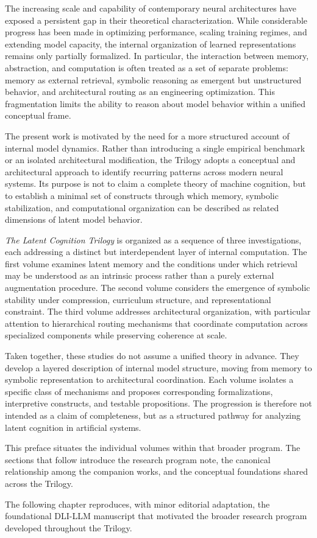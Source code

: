 The increasing scale and capability of contemporary neural architectures have exposed a persistent gap in their theoretical characterization. While considerable progress has been made in optimizing performance, scaling training regimes, and extending model capacity, the internal organization of learned representations remains only partially formalized. In particular, the interaction between memory, abstraction, and computation is often treated as a set of separate problems: memory as external retrieval, symbolic reasoning as emergent but unstructured behavior, and architectural routing as an engineering optimization. This fragmentation limits the ability to reason about model behavior within a unified conceptual frame.

The present work is motivated by the need for a more structured account of internal model dynamics. Rather than introducing a single empirical benchmark or an isolated architectural modification, the Trilogy adopts a conceptual and architectural approach to identify recurring patterns across modern neural systems. Its purpose is not to claim a complete theory of machine cognition, but to establish a minimal set of constructs through which memory, symbolic stabilization, and computational organization can be described as related dimensions of latent model behavior.

\textit{The Latent Cognition Trilogy} is organized as a sequence of three investigations, each addressing a distinct but interdependent layer of internal computation. The first volume examines latent memory and the conditions under which retrieval may be understood as an intrinsic process rather than a purely external augmentation procedure. The second volume considers the emergence of symbolic stability under compression, curriculum structure, and representational constraint. The third volume addresses architectural organization, with particular attention to hierarchical routing mechanisms that coordinate computation across specialized components while preserving coherence at scale.

Taken together, these studies do not assume a unified theory in advance. They develop a layered description of internal model structure, moving from memory to symbolic representation to architectural coordination. Each volume isolates a specific class of mechanisms and proposes corresponding formalizations, interpretive constructs, and testable propositions. The progression is therefore not intended as a claim of completeness, but as a structured pathway for analyzing latent cognition in artificial systems.

This preface situates the individual volumes within that broader program. The sections that follow introduce the research program note, the canonical relationship among the companion works, and the conceptual foundations shared across the Trilogy.

The following chapter reproduces, with minor editorial adaptation, the foundational DLI-LLM manuscript that motivated the broader research program developed throughout the Trilogy.